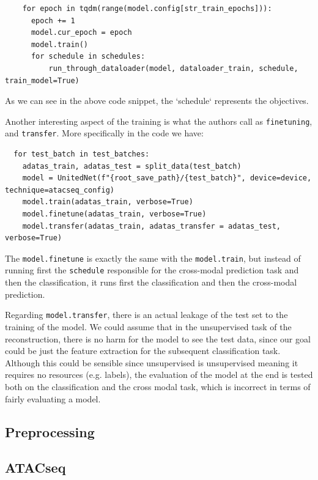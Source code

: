 \documentclass[12pt, a4paper]{article}
\begin{document}
\begin{verbatim}
    for epoch in tqdm(range(model.config[str_train_epochs])):
      epoch += 1
      model.cur_epoch = epoch
      model.train()
      for schedule in schedules:
          run_through_dataloader(model, dataloader_train, schedule, train_model=True)
\end{verbatim}

As we can see in the above code snippet, the `schedule` represents the objectives.

Another interesting aspect of the training is what the authors call as \verb|finetuning|, and \verb|transfer|. More specifically in the code we have:

\begin{verbatim}
  for test_batch in test_batches:
    adatas_train, adatas_test = split_data(test_batch)
    model = UnitedNet(f"{root_save_path}/{test_batch}", device=device, technique=atacseq_config)
    model.train(adatas_train, verbose=True)
    model.finetune(adatas_train, verbose=True)
    model.transfer(adatas_train, adatas_transfer = adatas_test, verbose=True)
\end{verbatim}

The \verb|model.finetune| is exactly the same with the \verb|model.train|, but instead of running first the \verb|schedule| responsible for the cross-modal prediction task and then the classification, it runs first the classification and then the cross-modal prediction.

Regarding \verb|model.transfer|, there is an actual leakage of the test set to the training of the model. We could assume that in the unsupervised task of the reconstruction, there is no harm for the model to see the test data, since our goal could be just the feature extraction for the subsequent classification task. Although this could be sensible since unsupervised is unsupervised meaning it requires no resources (e.g. labels), the evaluation of the model at the end is tested both on the classification and the cross modal task, which is incorrect in terms of fairly evaluating a model.



\subsection{Preprocessing}

\subsection{ATACseq}
\label{sec:atacseq}
\end{document}
